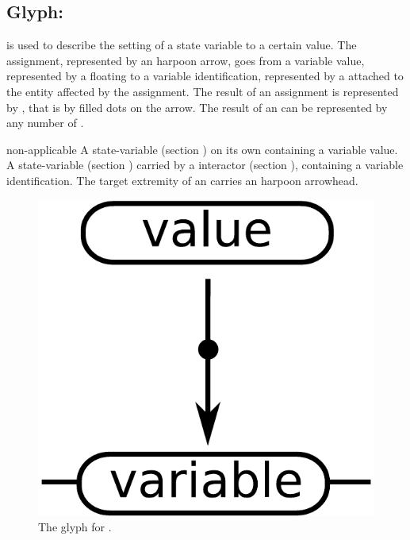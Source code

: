 \color{blue}

\subsection{Glyph: }\label{sec:assignment}

 is used to describe the setting of a state variable to a certain value. The assignment, represented by an harpoon arrow, goes from a variable value, represented by a floating  to a variable identification, represented by a  attached to the entity affected by the assignment.  The result of an assignment is represented by , that is by filled dots on the arrow. The result of an  can be represented by any number of .


\begin{glyphDescription}
 \glyphSboTerm non-applicable
 \glyphOrigin A state-variable (section ) on its own containing a variable value.
 \glyphTarget A state-variable (section ) carried by a interactor (section ), containing a variable identification.
 \glyphEndPoint The target extremity of an  carries an harpoon arrowhead.
 \end{glyphDescription}

\begin{figure}[H]
  \centering
  \includegraphics[scale = 0.5]{images/assignment}
  \caption{The \ER glyph for .}
  \label{fig:assignment}
\end{figure}

